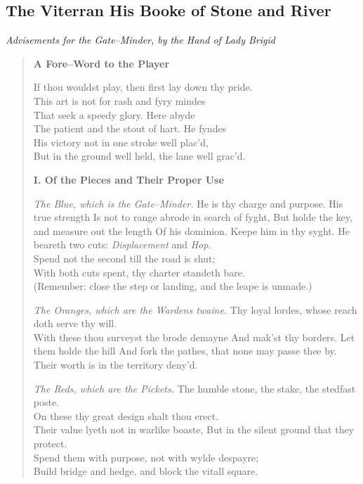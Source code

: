 \documentclass[11pt]{article}
\begin{document}
\clearpage

\subsection{The Viterran His Booke of Stone and River}
\noindent\textit{Advisements for the Gate--Minder, by the Hand of Lady Brigid}

\begin{quote}\small
\textbf{A Fore--Word to the Player}

If thou wouldst play, then first lay down thy pride.\\
This art is not for rash and fyry mindes\\
That seek a speedy glory. Here abyde\\
The patient and the stout of hart. He fyndes\\
His victory not in one stroke well plac’d,\\
But in the ground well held, the lane well grac’d.

\medskip
\textbf{I. Of the Pieces and Their Proper Use}

\textit{The Blue, which is the Gate--Minder.}
He is thy charge and purpose. His true strength
Is not to range abrode in search of fyght,
But holde the key, and measure out the length
Of his dominion. Keepe him in thy syght.
He beareth two cuts: \emph{Displacement} and \emph{Hop}.\\
Spend not the second till the road is shut;\\
With both cuts spent, thy charter standeth bare.\\
(Remember: close the step or landing, and the leape is unmade.)

\textit{The Oranges, which are the Wardens twaine.}
Thy loyal lordes, whose reach doth serve thy will.\\
With these thou surveyst the brode demayne
And mak’st thy borders. Let them holde the hill
And fork the pathes, that none may passe thee by.\\
Their worth is in the territory deny’d.

\textit{The Reds, which are the Pickets.}
The humble stone, the stake, the stedfast poste.\\
On these thy great design shalt thou erect.\\
Their value lyeth not in warlike boaste,
But in the silent ground that they protect.\\
Spend them with purpose, not with wylde despayre;\\
Build bridge and hedge, and block the vitall square.


\end{quote}
\end{document}
